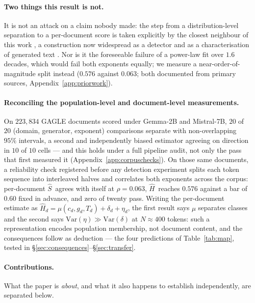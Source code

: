 \documentclass{article}
\newcommand{\Sest}{\ensuremath{\widehat{S}}}
\newcommand{\Hest}{\ensuremath{\widehat{H}}}
\begin{document}
\paragraph{Two things this result is not.}
It is not an attack on a claim nobody made: the step from a distribution-level
separation to a per-document score is taken explicitly by the closest
neighbour of this work \citep{tulchinskii2023intrinsic}, a construction now
widespread as a detector
\citep{guo2026multiscale,west2025nonstationary,liu2026wavedetect,mansouri2026stability,teja2025pife,lacava2026luminol}
and as a characterisation of generated text
\citep{du2025correlation,yang2026turbulence}. Nor is it the foreseeable
failure of a power-law fit over $1.6$ decades, which would fail both
exponents equally; we measure a near-order-of-magnitude split instead
($0.576$ against $0.063$; both documented from primary sources,
Appendix~\ref{app:priorwork}).

\paragraph{Reconciling the population-level and document-level measurements.}
On $223{,}834$ GAGLE documents \citep{alabdulmohsin2025tale} scored under
Gemma-2B and Mistral-7B, $20$ of $20$ (domain, generator, exponent)
comparisons separate with non-overlapping $95\%$ intervals, a second and
independently biased estimator agreeing on direction in $10$ of $10$ cells
--- and this holds under a full pipeline audit, not only the pass that first
measured it (Appendix~\ref{app:corpuschecks}).
On those same documents, a reliability check registered before any detection
experiment splits each token sequence into interleaved halves and correlates
both exponents across the corpus: per-document \Sest\ agrees with itself at
$\rho=0.063$, \Hest\ reaches $0.576$ against a bar of $0.60$ fixed in
advance, and zero of twenty pass.
Writing the per-document estimate as
$\Hest_d = \mu(c_d,g_d,T_d) + \delta_d + \eta_d$, the
first result says $\mu$ separates classes and the second says
$\mathrm{Var}(\eta)\gg\mathrm{Var}(\delta)$ at $N\!\approx\!400$ tokens: such a
representation encodes population membership, not document content, and the
consequences follow as deduction --- the four predictions of
Table~\ref{tab:map}, tested in \S\ref{sec:consequences}--\S\ref{sec:transfer}.

\paragraph{Contributions.} What the paper is \emph{about}, and what it also
happens to establish independently, are separated below.
\end{document}
